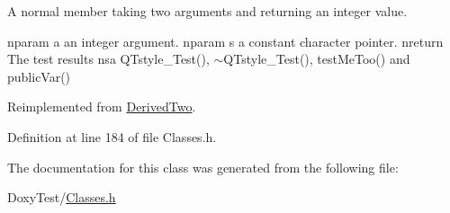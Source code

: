 A normal member taking two arguments and returning an integer value. 

nparam a an integer argument. nparam s a constant character pointer. nreturn The test results nsa Q\+Tstyle\+\_\+\+Test(), $\sim$\+Q\+Tstyle\+\_\+\+Test(), test\+Me\+Too() and public\+Var() 

Reimplemented from \hyperlink{class_derived_two_ae83bc07728d0af09413c6eb91c840e1d}{Derived\+Two}.



Definition at line 184 of file Classes.\+h.



The documentation for this class was generated from the following file\+:\begin{DoxyCompactItemize}
\item 
Doxy\+Test/\hyperlink{_classes_8h}{Classes.\+h}\end{DoxyCompactItemize}
